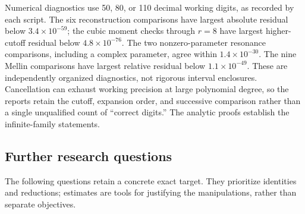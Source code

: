 Numerical diagnostics use 50, 80, or 110 decimal working digits, as
recorded by each script. The six reconstruction comparisons have largest
absolute residual below $3.4\times10^{-59}$; the cubic moment checks
through $r=8$ have largest higher-cutoff residual below
$4.8\times10^{-76}$. The two nonzero-parameter resonance comparisons,
including a complex parameter, agree within $1.4\times10^{-30}$.
The nine Mellin comparisons have largest relative residual below
$1.1\times10^{-49}$. These are independently organized diagnostics,
not rigorous interval enclosures. Cancellation can exhaust working
precision at large polynomial degree, so the reports retain the cutoff,
expansion order, and successive comparison rather than a single
unqualified count of ``correct digits.'' The analytic proofs establish
the infinite-family statements.

\subsection{Further research questions}

The following questions retain a concrete exact target. They prioritize
identities and reductions; estimates are tools for justifying the
manipulations, rather than separate objectives.

